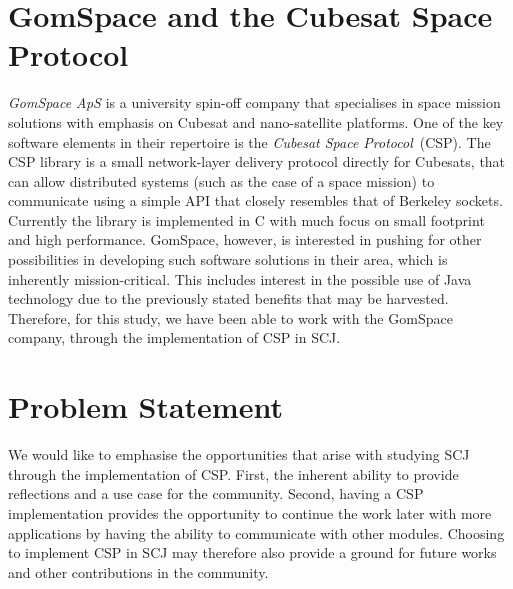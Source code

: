 \section{GomSpace and the Cubesat Space Protocol} %
\label{sec:gomspace_and_the_cubesat_space_protocol}
\textit{GomSpace ApS} is a university spin-off company that specialises in space mission solutions with emphasis on Cubesat and nano-satellite platforms\cite{GomSpace}. One of the key software elements in their repertoire is the \textit{Cubesat Space Protocol}~(CSP). The CSP library is a small network-layer delivery protocol directly for Cubesats, that can allow distributed systems (such as the case of a space mission) to communicate using a simple API that closely resembles that of Berkeley sockets. Currently the library is implemented in C with much focus on small footprint and high performance. GomSpace, however, is interested in pushing for other possibilities in developing such software solutions in their area, which is inherently mission-critical. This includes interest in the possible use of Java technology due to the previously stated benefits that may be harvested. Therefore, for this study, we have been able to work with the GomSpace company, through the implementation of CSP in SCJ. 


\section{Problem Statement} %
\label{sec:problem_statement}
We would like to emphasise the opportunities that arise with studying SCJ through the implementation of CSP. First, the inherent ability to provide reflections and a use case for the community. Second, having a CSP implementation provides the opportunity to continue the work later with more applications by having the ability to communicate with other modules. Choosing to implement CSP in SCJ may therefore also provide a ground for future works and other contributions in the community.

